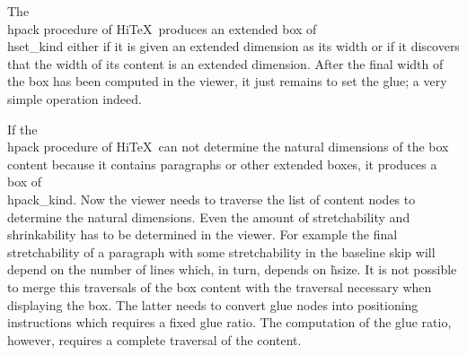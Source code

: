 The \\{hpack} procedure of Hi\TeX\ produces an extended box of \\{hset\_kind}
either if it is given an extended dimension as its width
or if it discovers that the width of its content is an extended
dimension.  After the final width of the box has been computed in the
viewer, it just remains to set the glue; a very simple operation
indeed.

If the \\{hpack} procedure of Hi\TeX\ can not determine the natural
dimensions of the box content because it contains
paragraphs or other extended boxes, it produces a box
of \\{hpack\_kind}.  Now the viewer needs to traverse the list of content
nodes to determine the natural
dimensions. Even the amount of stretchability
and shrinkability has to be determined in the
viewer. For example the final stretchability of a paragraph with some
stretchability in the baseline skip will depend
on the number of lines which, in turn, depends on \.{hsize}.  It is
not possible to merge this traversals of the box content with the
traversal necessary when displaying the box. The latter needs to
convert glue nodes into positioning instructions which requires a
fixed glue ratio. The computation of the glue ratio,
however, requires a complete traversal of the content.

